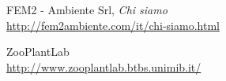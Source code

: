 \begin{thebibliography}{99}

	FEM2 - Ambiente Srl, \emph{Chi siamo} \\
	\url{http://fem2ambiente.com/it/chi-siamo.html}

	ZooPlantLab \\
	\url{http://www.zooplantlab.btbs.unimib.it/}

\end{thebibliography}
